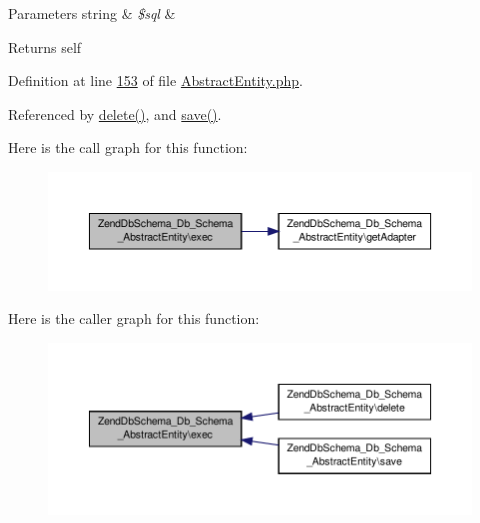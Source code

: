 \begin{DoxyParams}[1]{Parameters}
string & {\em \$sql} & \\
\hline
\end{DoxyParams}
\begin{DoxyReturn}{Returns}
self 
\end{DoxyReturn}


Definition at line \hyperlink{AbstractEntity_8php_source_l00153}{153} of file \hyperlink{AbstractEntity_8php_source}{Abstract\-Entity.\-php}.



Referenced by \hyperlink{AbstractEntity_8php_source_l00192}{delete()}, and \hyperlink{AbstractEntity_8php_source_l00169}{save()}.



Here is the call graph for this function\-:\nopagebreak
\begin{figure}[H]
\begin{center}
\leavevmode
\includegraphics[width=350pt]{classZendDbSchema__Db__Schema__AbstractEntity_a7ddb87869e3021260c12bb57df4ba8c1_cgraph}
\end{center}
\end{figure}




Here is the caller graph for this function\-:\nopagebreak
\begin{figure}[H]
\begin{center}
\leavevmode
\includegraphics[width=350pt]{classZendDbSchema__Db__Schema__AbstractEntity_a7ddb87869e3021260c12bb57df4ba8c1_icgraph}
\end{center}
\end{figure}


